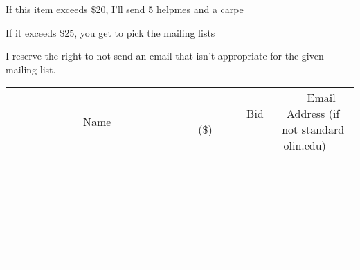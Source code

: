 \documentclass[11pt]{article}
\begin{document}
If this item exceeds \$20, I'll send 5 helpmes and a carpe

If it exceeds \$25, you get to pick the mailing lists

I reserve the right to not send an email that isn't appropriate for the given mailing list.
\\[6ex]
\begin{tabular}{c c c}
~~~~~~~~~~~~~Name~~~~~~~~~~~~~ & ~~~~~~~~~Bid (\$)~~~~~~~~~  & ~~~Email Address (if not standard olin.edu)~~~\\
 & & \\
\hline
 & & \\
\hline
 & & \\
\hline
 & & \\
\hline
 & & \\
\hline
 & & \\
\hline
 & & \\
\hline
 & & \\
\hline
 & & \\
\hline
 & & \\
\hline
 & & \\
\hline
 & & \\
\hline
 & & \\
\hline
 & & \\
\hline
 & & \\
\hline
 & & \\
\hline
 & & \\
\hline
 & & \\
\hline
 & & \\
\hline
 & & \\
\hline
 & & \\
\hline
 & & \\
\hline
 & & \\
\hline
 & & \\
\hline
 & & \\
\hline
 & & \\
\hline
\end{tabular}
\newpage
\end{document}

